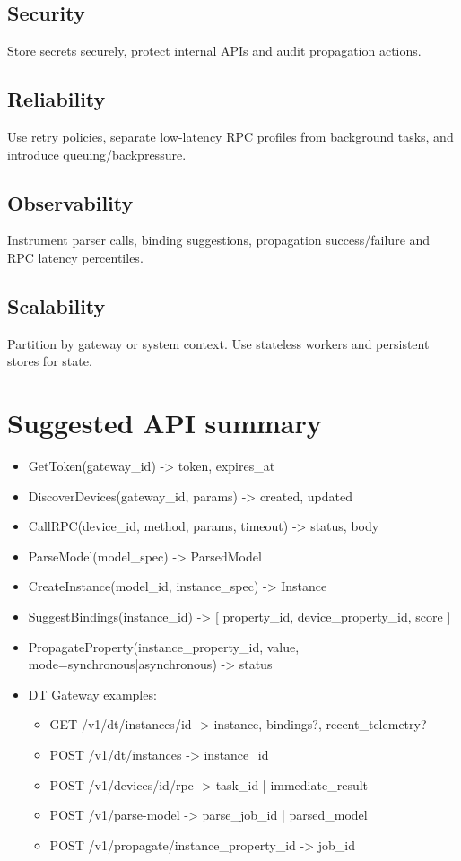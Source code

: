 \documentclass[11pt,a4paper]{article}
\begin{document}
\subsection{Security}
Store secrets securely, protect internal APIs and audit propagation actions.

\subsection{Reliability}
Use retry policies, separate low-latency RPC profiles from background tasks, and introduce queuing/backpressure.

\subsection{Observability}
Instrument parser calls, binding suggestions, propagation success/failure and RPC latency percentiles.

\subsection{Scalability}
Partition by gateway or system context. Use stateless workers and persistent stores for state.

\section{Suggested API summary}
\begin{itemize}
  \item GetToken(gateway_id) -> { token, expires_at }
  \item DiscoverDevices(gateway_id, params) -> { created, updated }
  \item CallRPC(device_id, method, params, timeout) -> { status, body }
  \item ParseModel(model_spec) -> ParsedModel
  \item CreateInstance(model_id, instance_spec) -> Instance
  \item SuggestBindings(instance_id) -> [ { property_id, device_property_id, score } ]
  \item PropagateProperty(instance_property_id, value, mode=synchronous|asynchronous) -> { status }
  \item DT Gateway examples:
  \begin{itemize}
    \item GET /v1/dt/instances/{id} -> { instance, bindings?, recent_telemetry? }
    \item POST /v1/dt/instances -> { instance_id }
    \item POST /v1/devices/{id}/rpc -> { task_id | immediate_result }
    \item POST /v1/parse-model -> { parse_job_id | parsed_model }
    \item POST /v1/propagate/{instance_property_id} -> { job_id }
  \end{itemize}
\end{itemize}
\end{document}
